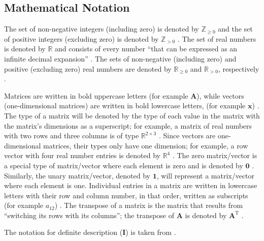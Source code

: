 \documentclass[12pt]{article}
\newcommand*{\defDesc}{\mathbf{I}}
\newcommand*{\nonnegInt}{\mathbb{Z}_{\geq 0}}
\newcommand*{\posInt}{\mathbb{Z}_{> 0}}
\newcommand*{\nonnegReal}{\mathbb{R}_{\geq 0}}
\newcommand*{\posReal}{\mathbb{R}_{> 0}}
\begin{document}
\subsection{Mathematical Notation} \label{sec_mathNot}

The set of non-negative integers (including zero) is denoted by $\nonnegInt$
and the set of positive integers (excluding zero) is denoted by $\posInt$
\cite{wikipedia_natural_2023}. The
set of real numbers is denoted by $\mathbb{R}$ and consists of every number
``that can be expressed as an infinite decimal expansion''
\cite{the_editors_of_encyclopaedia_britannica_real_2022}. The sets of
non-negative (including zero) and positive (excluding zero) real numbers are
denoted by $\nonnegReal$ and $\posReal$, respectively
\cite{wikipedia_positive_2023}.

Matrices are written in bold uppercase letters (for example $\textbf{A}$),
while vectors (one-dimensional matrices) are written in bold lowercase letters,
(for example
$\textbf{x}$) \cite{osullivan_appendix_2010}. The type of a matrix will be
denoted by the type of each value in the matrix with the matrix's dimensions
as a superscript; for example, a matrix of real numbers with two rows and
three columns is of type $\mathbb{R}^{2 \times 3}$
\cite[p.~3]{golub_matrix_2013}. Since vectors are one-dimensional
matrices, their types only have one dimension; for example, a row vector with
four real number entries is denoted by $\mathbb{R}^{4}$
\cite[p.~4]{golub_matrix_2013}. The zero matrix/vector is a special
type of matrix/vector where each element is zero and is denoted by
$\textbf{0}$ \cite{weisstein_zero_2023}. Similarly, the unary matrix/vector,
denoted by $\textbf{1}$, will represent a matrix/vector where each element is
one. Individual entries in a matrix are written in
lowercase letters with their row and column number, in that order, written as
subscripts (for example $a_{12}$) \cite{osullivan_appendix_2010}.
The transpose of a matrix is the matrix that results from ``switching its rows
with its columns''; the transpose of $\mathbf{A}$ is denoted by
$\mathbf{A}^\mathrm{T}$ \cite{nykamp_transpose_nodate}.

The notation for definite description ($\defDesc$) is taken from
\cite{farmer_simple_2023}.
\end{document}
